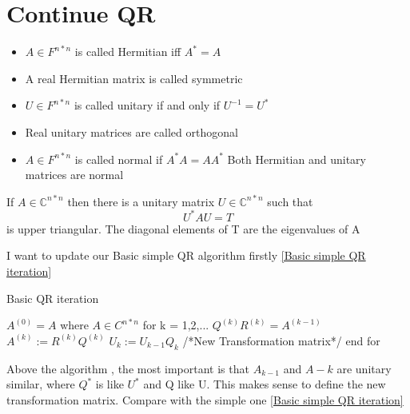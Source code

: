 \section{Continue QR}
\label{Section Continue QR}
\begin{definition}
\begin{itemize}
    \item $A\in F^{n*n}$ is called Hermitian iff $A^* = A$

    \item A real Hermitian matrix is called symmetric

    \item $U \in F^{n*n}$ is called unitary if and only if $U^{-1}=U^*$

    \item Real unitary matrices are called orthogonal

    \item $A\in F^{n*n}$ is called normal if $A^*A=AA^*$ Both Hermitian and unitary matrices are normal 
\end{itemize}
   
\end{definition}

\begin{theorem}
    If $A \in {\mathbb{C}}^{n*n}$ then there is a unitary matrix $U \in {\mathbb{C}}^{n*n}$ such that \begin{equation}
        U^*AU =T
    \end{equation}
    is upper triangular. The diagonal elements of T are the eigenvalues of A
\end{theorem}

I want to update our Basic simple QR algorithm firstly \ref{Basic simple QR iteration}
\begin{algorithm}
\caption{Basic QR iteration}
\label{Basic  QR iteration}
    \begin{algorithmic}
        \STATE \(A^{(0)} = A\) where \(A \in C^{n*n}\)
        \STATE for k = 1,2,...
            \STATE \quad \(Q^{(k)}R^{(k)} = A^{(k-1)}\)
            \STATE \quad \(A^{(k)} := R^{(k)}Q^{(k)}\)
            \STATE \quad \(U_k := U_{k-1}Q_k\) /*New Transformation matrix*/
        \STATE end for
    \end{algorithmic}
\end{algorithm}
Above the algorithm , the most important is that $A_{k-1}$ and $A-k$ are unitary similar, where $Q^*$ is like $U^*$ and Q like U. This makes sense to define the new transformation matrix. Compare with the simple one \ref{Basic simple QR iteration}

